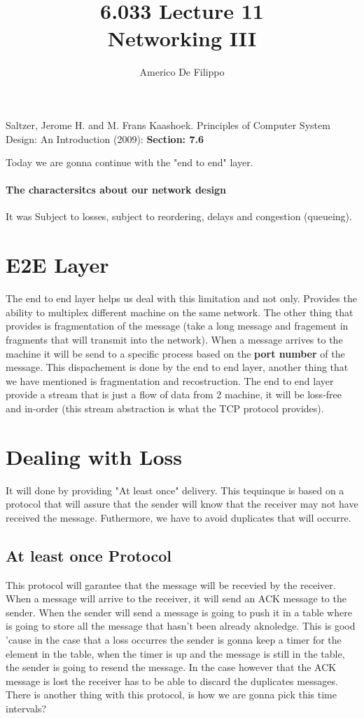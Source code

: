 \documentclass{article}
\title{6.033 Lecture 11 \\ Networking III}
\author{Americo De Filippo}
\begin{document}
 
  \maketitle
  \begin{thebibliography}{9}
    Saltzer, Jerome H. and M. Frans Kaashoek. Principles of Computer System Design: An Introduction (2009): \textbf{Section: 7.6}
  \end{thebibliography}
  Today we are gonna continue with the "end to end" layer.
  \paragraph{The charactersitcs about our network design}
    It was Subject to losses, subject to reordering, delays and congestion (queueing).
  \section{E2E Layer}
    The end to end layer helps us deal with this limitation and not only. Provides 
    the ability to multiplex different machine on the same network. The other thing 
    that provides is fragmentation of the message (take a long message and fragement in
    fragments that will transmit into the network). When a message arrives to the machine 
    it will be send to a specific process based on the \textbf{port number} of the message. 
    This dispachement is done by the end to end layer, another thing that we have mentioned is
    fragmentation and recostruction. The end to end layer provide a stream that is just a flow of
    data from 2 machine, it will be loss-free and in-order (this stream abstraction is what the
    TCP protocol provides).
  \section{Dealing with Loss}
    It will done by providing "At least once" delivery. This tequinque is based on a protocol 
    that will assure that the sender will know that the receiver may not have received the
    message. Futhermore, we have to avoid duplicates that will occurre. 
    \subsection{At least once Protocol}
      This protocol will garantee that the message will be recevied by the receiver. When 
      a message will arrive to the receiver, it will send an ACK message to the sender.
      When the sender will send a message is going to push it in a table where is going 
      to store all the message that hasn't been already aknoledge. This is good 'cause 
      in the case that a loss occurres the sender is gonna keep a timer for the element
      in the table, when the timer is up and the message is still in the table, the sender
      is going to resend the message. In the case however that the ACK message is lost 
      the receiver has to be able to discard the duplicates messages. There is another 
      thing with this protocol, is how we are gonna pick this time intervals? 
\end{document}
